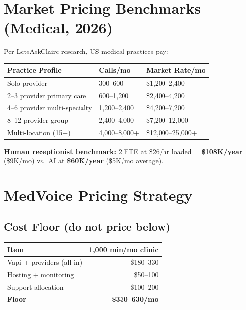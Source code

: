 \documentclass[11pt,a4paper]{article}
\begin{document}
\section{Market Pricing Benchmarks (Medical, 2026)}

Per LetsAskClaire research, US medical practices pay:

\begin{center}
\begin{tabular}{@{}lll@{}}
\toprule
\textbf{Practice Profile} & \textbf{Calls/mo} & \textbf{Market Rate/mo} \\
\midrule
Solo provider & 300--600 & \$1,200--2,400 \\
2--3 provider primary care & 600--1,200 & \$2,400--4,200 \\
4--6 provider multi-specialty & 1,200--2,400 & \$4,200--7,200 \\
8--12 provider group & 2,400--4,000 & \$7,200--12,000 \\
Multi-location (15+) & 4,000--8,000+ & \$12,000--25,000+ \\
\bottomrule
\end{tabular}
\end{center}

\textbf{Human receptionist benchmark:} 2 FTE at \$26/hr loaded = \textbf{\$108K/year} (\$9K/mo) vs.\ AI at \textbf{\$60K/year} (\$5K/mo average).

\section{MedVoice Pricing Strategy}

\subsection{Cost Floor (do not price below)}

\begin{center}
\begin{tabular}{@{}lr@{}}
\toprule
\textbf{Item} & \textbf{1,000 min/mo clinic} \\
\midrule
Vapi + providers (all-in) & \$180--330 \\
Hosting + monitoring & \$50--100 \\
Support allocation & \$100--200 \\
\midrule
\textbf{Floor} & \textbf{\$330--630/mo} \\
\bottomrule
\end{tabular}
\end{center}
\end{document}
